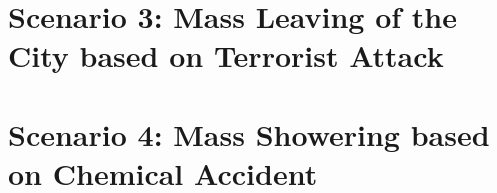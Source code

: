\section{Scenario 3: Mass Leaving of the City based on Terrorist Attack}

\section{Scenario 4: Mass Showering based on Chemical Accident}


